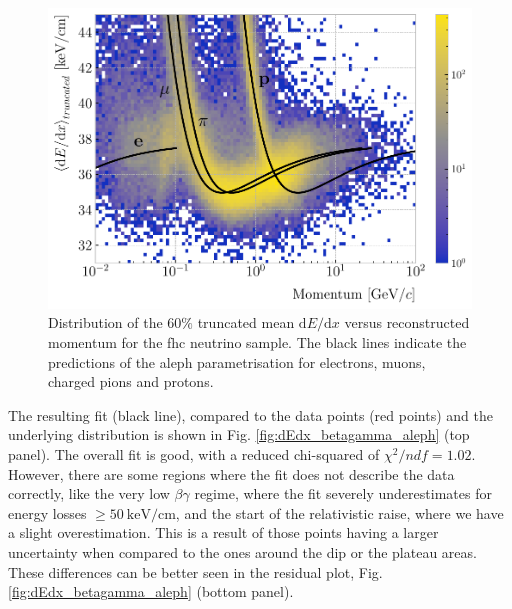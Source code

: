 \begin{figure}[t]
	\centering
	\includegraphics[width=.90\linewidth]{Images/GArSoft_PID/dEdx/dEdx_curves_with_fit.pdf}
	\caption[Distribution of the $60\%$ truncated mean $\mathrm{d}E/\mathrm{d}x$ versus reconstructed momentum for the \gls{fhc} neutrino sample.]{Distribution of the $60\%$ truncated mean $\mathrm{d}E/\mathrm{d}x$ versus reconstructed momentum for the \gls{fhc} neutrino sample. The black lines indicate the predictions of the \gls{aleph} parametrisation for electrons, muons, charged pions and protons.}
	\label{fig:dEdx_vs_momentum}
\end{figure}

The resulting fit (black line), compared to the data points (red points) and the underlying distribution is shown in Fig. \ref{fig:dEdx_betagamma_aleph} (top panel). The overall fit is good, with a reduced chi-squared of $\chi^{2}/ndf=1.02$. However, there are some regions where the fit does not describe the data correctly, like the very low $\beta\gamma$ regime, where the fit severely underestimates for energy losses $\geq 50 ~ \mathrm{keV}/\mathrm{cm}$, and the start of the relativistic raise, where we have a slight overestimation. This is a result of those points having a larger uncertainty when compared to the ones around the dip or the plateau areas. These differences can be better seen in the residual plot, Fig. \ref{fig:dEdx_betagamma_aleph} (bottom panel).

